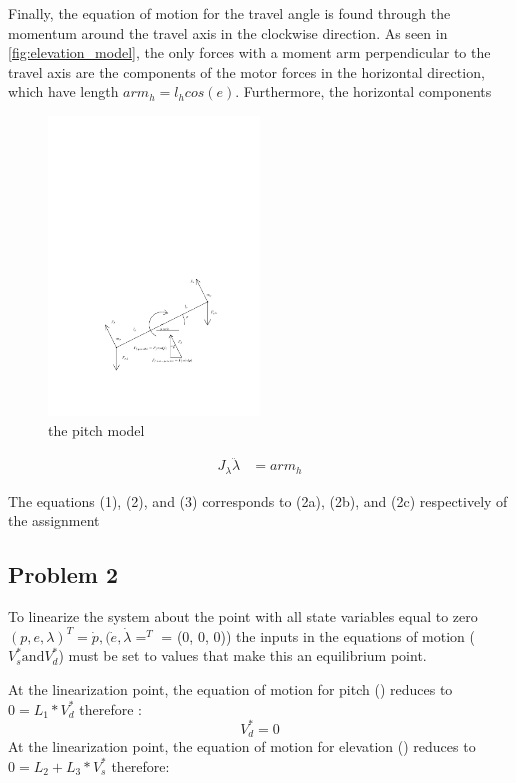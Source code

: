 Finally, the equation of motion for the travel angle is found through
the momentum around the travel axis in the  clockwise direction. As
seen in \cref{fig:elevation_model}, the only forces with a moment arm
perpendicular to the travel axis are the components of the motor
forces in the horizontal direction, which have length $arm_h =
l_hcos(e)$. Furthermore, the horizontal components


\begin{figure}[H]
  \caption{the pitch model}
  \label{fig:pitch_model}
  \includegraphics[width=0.5\textwidth]{images/pitch_model}
\end{figure}

\begin{align*}
  J_\lambda\ddot{\lambda} &= arm_h
\end{align*}

The equations (1), (2), and (3) corresponds to (2a), (2b), and (2c) respectively of the assignment \cite[p.13]{assignment}

\subsection{Problem 2}
To linearize the system about the point with all state variables equal
to zero $(p, e, \lambda)^T = \dot{p},(\dot{e},\dot{\lambda}=^T $ = (0, 0, 0))
the inputs in the equations of motion ($V^{*}_{s} \text{and} V^{*}_{d}$) must be set to
values that make this an equilibrium point.

At the linearization point, the equation of motion for pitch
() reduces to $0 = L_{1} *
V^{*}_{d}$ therefore
:
\begin{equation}
  V^{*}_{d} = 0
\end{equation}
At the linearization point, the equation of motion for elevation
() reduces to $0 = L_{2} +
L_{3}*V^{*}_{s}$ therefore:

